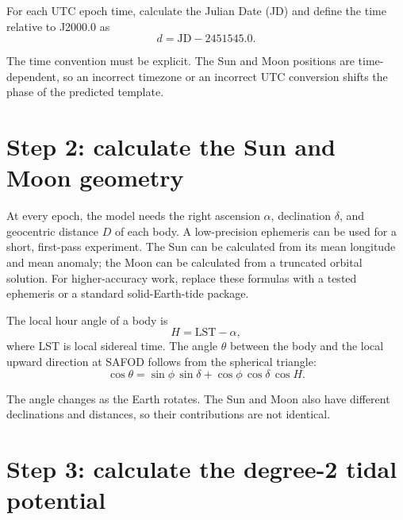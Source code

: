\documentclass[11pt]{article}
\begin{document}
For each UTC epoch time, calculate the Julian Date (JD) and define the time
relative to J2000.0 as
\begin{equation}
  d = \mathrm{JD} - 2451545.0.
  \label{eq:j2000}
\end{equation}

The time convention must be explicit.  The Sun and Moon positions are
time-dependent, so an incorrect timezone or an incorrect UTC conversion
shifts the phase of the predicted template.

\section{Step 2: calculate the Sun and Moon geometry}

At every epoch, the model needs the right ascension $\alpha$, declination
$\delta$, and geocentric distance $D$ of each body.  A low-precision ephemeris
can be used for a short, first-pass experiment.  The Sun can be calculated
from its mean longitude and mean anomaly; the Moon can be calculated from a
truncated orbital solution.  For higher-accuracy work, replace these formulas
with a tested ephemeris or a standard solid-Earth-tide package.

The local hour angle of a body is
\begin{equation}
  H = \mathrm{LST} - \alpha,
  \label{eq:hour_angle}
\end{equation}
where LST is local sidereal time.  The angle $\theta$ between the body and the
local upward direction at SAFOD follows from the spherical triangle:
\begin{equation}
  \cos\theta
  = \sin\phi\,\sin\delta
    + \cos\phi\,\cos\delta\,\cos H.
  \label{eq:zenith_angle}
\end{equation}

The angle changes as the Earth rotates.  The Sun and Moon also have different
declinations and distances, so their contributions are not identical.

\section{Step 3: calculate the degree-2 tidal potential}
\end{document}
